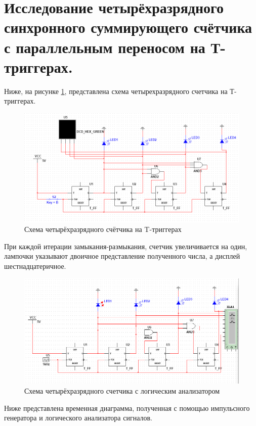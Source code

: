 \section{Исследование четырёхразрядного синхронного суммирующего
счётчика с параллельным переносом на Т-триггерах.}

Ниже, на рисунке \ref{sc1}, представлена схема четырехразрядного счетчика на Т-триггерах.

\begin{figure}[ht]
    \centering
    \includegraphics[width=\linewidth]{img/sc1.png}
    \caption{Схема четырёхразрядного счётчика на T-триггерах}
    \label{sc1}
\end{figure}

При каждой итерации замыкания-размыкания, счетчик увеличивается на один, лампочки указывают двоичное представление полученного числа, а дисплей шестнадцатеричное.

\begin{figure}[ht]
    \centering
    \includegraphics[width=\linewidth]{img/sc2.png}
    \caption{Схема четырёхразрядного счетчика с логическим анализатором}
    \label{sc2}
\end{figure}

Ниже представлена временная диаграмма, полученная с помощью импульсного генератора и логического анализатора сигналов.

